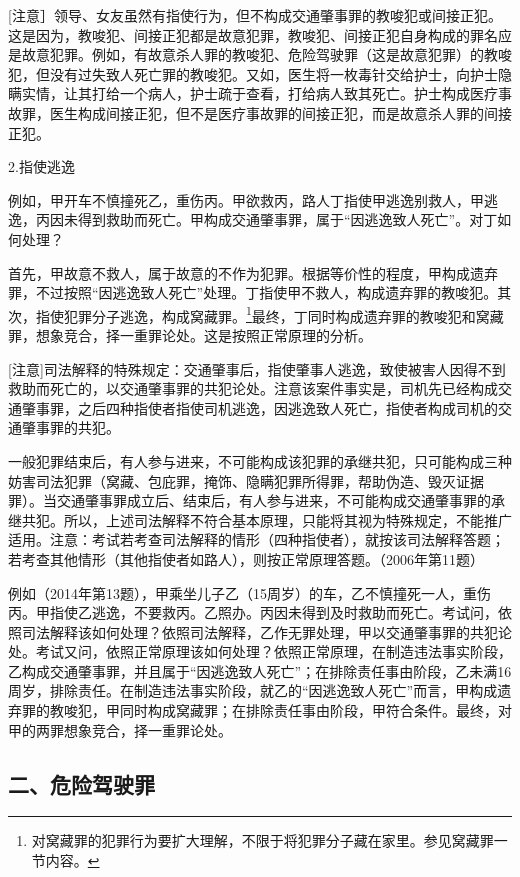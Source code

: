 [注意］领导、女友虽然有指使行为，但不构成交通肇事罪的教唆犯或间接正犯。这是因为，教唆犯、间接正犯都是故意犯罪，教唆犯、间接正犯自身构成的罪名应是故意犯罪。例如，有故意杀人罪的教唆犯、危险驾驶罪（这是故意犯罪）的教唆犯，但没有过失致人死亡罪的教唆犯。又如，医生将一枚毒针交给护士，向护士隐瞒实情，让其打给一个病人，护士疏于查看，打给病人致其死亡。护士构成医疗事故罪，医生构成间接正犯，但不是医疗事故罪的间接正犯，而是故意杀人罪的间接正犯。

2.指使逃逸

例如，甲开车不慎撞死乙，重伤丙。甲欲救丙，路人丁指使甲逃逸别救人，甲逃逸，丙因未得到救助而死亡。甲构成交通肇事罪，属于“因逃逸致人死亡”。对丁如何处理？

首先，甲故意不救人，属于故意的不作为犯罪。根据等价性的程度，甲构成遗弃罪，不过按照“因逃逸致人死亡”处理。丁指使甲不救人，构成遗弃罪的教唆犯。其次，指使犯罪分子逃逸，构成窝藏罪。\footnote{对窝藏罪的犯罪行为要扩大理解，不限于将犯罪分子藏在家里。参见窝藏罪一节内容。}最终，丁同时构成遗弃罪的教唆犯和窝藏罪，想象竞合，择一重罪论处。这是按照正常原理的分析。

[注意]司法解释的特殊规定：交通肇事后，指使肇事人逃逸，致使被害人因得不到救助而死亡的，以交通肇事罪的共犯论处。注意该案件事实是，司机先已经构成交通肇事罪，之后四种指使者指使司机逃逸，因逃逸致人死亡，指使者构成司机的交通肇事罪的共犯。

一般犯罪结束后，有人参与进来，不可能构成该犯罪的承继共犯，只可能构成三种妨害司法犯罪（窝藏、包庇罪，掩饰、隐瞒犯罪所得罪，帮助伪造、毁灭证据罪）。当交通肇事罪成立后、结束后，有人参与进来，不可能构成交通肇事罪的承继共犯。所以，上述司法解释不符合基本原理，只能将其视为特殊规定，不能推广适用。注意：考试若考查司法解释的情形（四种指使者），就按该司法解释答题；若考查其他情形（其他指使者如路人），则按正常原理答题。（2006年第11题）

例如（2014年第13题），甲乘坐儿子乙（15周岁）的车，乙不慎撞死一人，重伤丙。甲指使乙逃逸，不要救丙。乙照办。丙因未得到及时救助而死亡。考试问，依照司法解释该如何处理？依照司法解释，乙作无罪处理，甲以交通肇事罪的共犯论处。考试又问，依照正常原理该如何处理？依照正常原理，在制造违法事实阶段，乙构成交通肇事罪，并且属于“因逃逸致人死亡”；在排除责任事由阶段，乙未满16周岁，排除责任。在制造违法事实阶段，就乙的“因逃逸致人死亡”而言，甲构成遗弃罪的教唆犯，甲同时构成窝藏罪；在排除责任事由阶段，甲符合条件。最终，对甲的两罪想象竞合，择一重罪论处。

\subsection*{二、危险驾驶罪}


